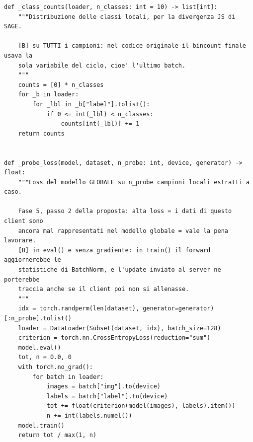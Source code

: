 \documentclass[11pt,a4paper]{article}
\begin{document}
\begin{lstlisting}[style=py,firstnumber=103,caption={\texttt{tesifl/tesiFL/client\_app.py}, lines 103--138}]
def _class_counts(loader, n_classes: int = 10) -> list[int]:
    """Distribuzione delle classi locali, per la divergenza JS di SAGE.

    [B] su TUTTI i campioni: nel codice originale il bincount finale usava la
    sola variabile del ciclo, cioe' l'ultimo batch.
    """
    counts = [0] * n_classes
    for _b in loader:
        for _lbl in _b["label"].tolist():
            if 0 <= int(_lbl) < n_classes:
                counts[int(_lbl)] += 1
    return counts


def _probe_loss(model, dataset, n_probe: int, device, generator) -> float:
    """Loss del modello GLOBALE su n_probe campioni locali estratti a caso.

    Fase 5, passo 2 della proposta: alta loss = i dati di questo client sono
    ancora mal rappresentati nel modello globale = vale la pena lavorare.
    [B] in eval() e senza gradiente: in train() il forward aggiornerebbe le
    statistiche di BatchNorm, e l'update inviato al server ne porterebbe
    traccia anche se il client poi non si allenasse.
    """
    idx = torch.randperm(len(dataset), generator=generator)[:n_probe].tolist()
    loader = DataLoader(Subset(dataset, idx), batch_size=128)
    criterion = torch.nn.CrossEntropyLoss(reduction="sum")
    model.eval()
    tot, n = 0.0, 0
    with torch.no_grad():
        for batch in loader:
            images = batch["img"].to(device)
            labels = batch["label"].to(device)
            tot += float(criterion(model(images), labels).item())
            n += int(labels.numel())
    model.train()
    return tot / max(1, n)
\end{lstlisting}
\end{document}
